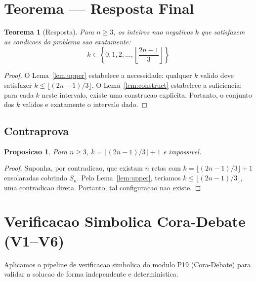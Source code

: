 \documentclass[5p]{elsarticle}
\newtheorem{theorem}[lemma]{Teorema}
\newtheorem{proposition}[lemma]{Proposicao}
\theoremstyle{definition}
\begin{document}
\section{Teorema — Resposta Final}

\begin{theorem}[Resposta]\label{thm:final}
  Para $n \geq 3$, os inteiros nao negativos $k$ que satisfazem as condicoes do
  problema sao exatamente:
  \begin{equation}\label{eq:resposta}
    k \in \left\{0, 1, 2, \dots, \left\lfloor \frac{2n-1}{3} \right\rfloor \right\}
  \end{equation}
\end{theorem}

\begin{proof}
  O Lema~\ref{lem:upper} estabelece a necessidade: qualquer $k$ valido deve satisfazer
  $k \leq \lfloor(2n-1)/3\rfloor$. O Lema~\ref{lem:construct} estabelece a suficiencia:
  para cada $k$ neste intervalo, existe uma construcao explicita. Portanto, o conjunto
  dos $k$ validos e exatamente o intervalo dado.
\end{proof}

\subsection{Contraprova}

\begin{proposition}
  Para $n \geq 3$, $k = \lfloor(2n-1)/3\rfloor + 1$ e impossivel.
\end{proposition}

\begin{proof}
  Suponha, por contradicao, que existam $n$ retas com $k = \lfloor(2n-1)/3\rfloor + 1$
  ensolaradas cobrindo $S_n$. Pelo Lema~\ref{lem:upper}, teriamos $k \leq \lfloor(2n-1)/3\rfloor$,
  uma contradicao direta. Portanto, tal configuracao nao existe.
\end{proof}

\section{Verificacao Simbolica Cora-Debate (V1--V6)}

Aplicamos o pipeline de verificacao simbolica do modulo P19 (Cora-Debate) para
validar a solucao de forma independente e deterministica.
\end{document}

